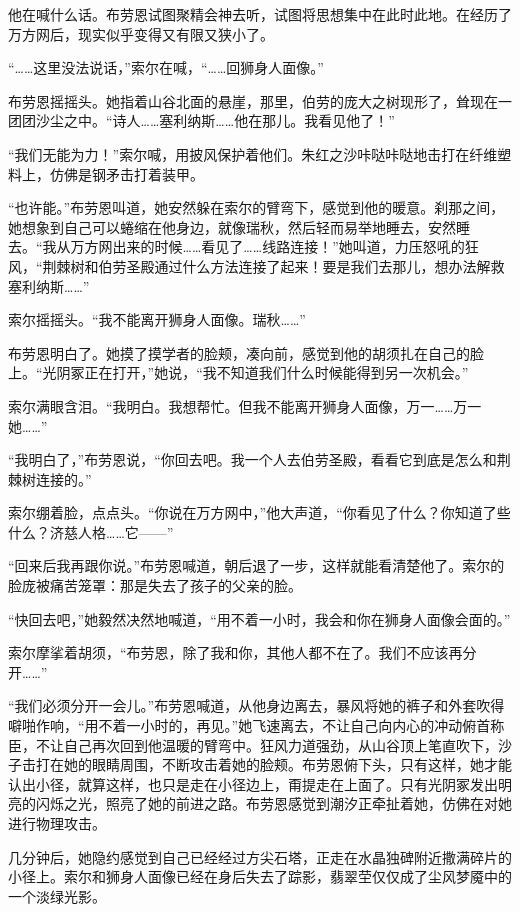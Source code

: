 \documentclass[AutoFakeBold=true]{book}
\begin{document}
他在喊什么话。布劳恩试图聚精会神去听，试图将思想集中在此时此地。在经历了万方网后，现实似乎变得又有限又狭小了。

``……这里没法说话，''索尔在喊，``……回狮身人面像。''

布劳恩摇摇头。她指着山谷北面的悬崖，那里，伯劳的庞大之树现形了，耸现在一团团沙尘之中。``诗人……塞利纳斯……他在那儿。我看见他了！''

``我们无能为力！''索尔喊，用披风保护着他们。朱红之沙咔哒咔哒地击打在纤维塑料上，仿佛是钢矛击打着装甲。

``也许能。''布劳恩叫道，她安然躲在索尔的臂弯下，感觉到他的暖意。刹那之间，她想象到自己可以蜷缩在他身边，就像瑞秋，然后轻而易举地睡去，安然睡去。``我从万方网出来的时候……看见了……线路连接！''她叫道，力压怒吼的狂风，``荆棘树和伯劳圣殿通过什么方法连接了起来！要是我们去那儿，想办法解救塞利纳斯……''

索尔摇摇头。``我不能离开狮身人面像。瑞秋……''

布劳恩明白了。她摸了摸学者的脸颊，凑向前，感觉到他的胡须扎在自己的脸上。``光阴冢正在打开，''她说，``我不知道我们什么时候能得到另一次机会。''

索尔满眼含泪。``我明白。我想帮忙。但我不能离开狮身人面像，万一……万一她……''

``我明白了，''布劳恩说，``你回去吧。我一个人去伯劳圣殿，看看它到底是怎么和荆棘树连接的。''

索尔绷着脸，点点头。``你说在万方网中，''他大声道，``你看见了什么？你知道了些什么？济慈人格……它——''

``回来后我再跟你说。''布劳恩喊道，朝后退了一步，这样就能看清楚他了。索尔的脸庞被痛苦笼罩：那是失去了孩子的父亲的脸。

``快回去吧，''她毅然决然地喊道，``用不着一小时，我会和你在狮身人面像会面的。''

索尔摩挲着胡须，``布劳恩，除了我和你，其他人都不在了。我们不应该再分开……''

``我们必须分开一会儿。''布劳恩喊道，从他身边离去，暴风将她的裤子和外套吹得噼啪作响，``用不着一小时的，再见。''她飞速离去，不让自己向内心的冲动俯首称臣，不让自己再次回到他温暖的臂弯中。狂风力道强劲，从山谷顶上笔直吹下，沙子击打在她的眼睛周围，不断攻击着她的脸颊。布劳恩俯下头，只有这样，她才能认出小径，就算这样，也只是走在小径边上，甭提走在上面了。只有光阴冢发出明亮的闪烁之光，照亮了她的前进之路。布劳恩感觉到潮汐正牵扯着她，仿佛在对她进行物理攻击。

几分钟后，她隐约感觉到自己已经经过方尖石塔，正走在水晶独碑附近撒满碎片的小径上。索尔和狮身人面像已经在身后失去了踪影，翡翠茔仅仅成了尘风梦魇中的一个淡绿光影。
\end{document}
